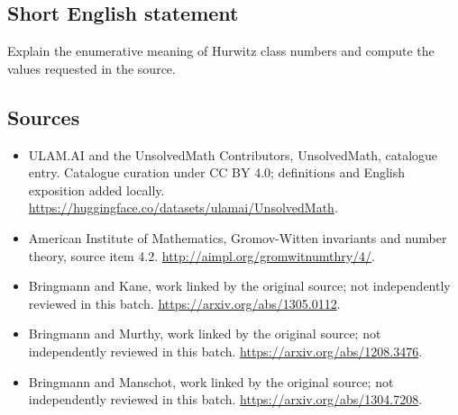 \documentclass[11pt]{article}
\begin{document}
\subsection{Short English statement}
Explain the enumerative meaning of Hurwitz class numbers and compute the values requested in the source.
\subsection{Sources}
\begin{itemize}
\item[\hypertarget{source:statement:1}{S1}] ULAM.AI and the UnsolvedMath Contributors, UnsolvedMath, catalogue entry. Catalogue curation under CC BY 4.0; definitions and English exposition added locally.
\url{https://huggingface.co/datasets/ulamai/UnsolvedMath}.
\item[\hypertarget{source:statement:2}{S2}] American Institute of Mathematics, Gromov-Witten invariants and number theory, source item 4.2.
\url{http://aimpl.org/gromwitnumthry/4/}.
\item[\hypertarget{source:statement:3}{S3}] Bringmann and Kane, work linked by the original source; not independently reviewed in this batch.
\url{https://arxiv.org/abs/1305.0112}.
\item[\hypertarget{source:statement:4}{S4}] Bringmann and Murthy, work linked by the original source; not independently reviewed in this batch.
\url{https://arxiv.org/abs/1208.3476}.
\item[\hypertarget{source:statement:5}{S5}] Bringmann and Manschot, work linked by the original source; not independently reviewed in this batch.
\url{https://arxiv.org/abs/1304.7208}.
\end{itemize}
\label{end:statement}
\end{document}
